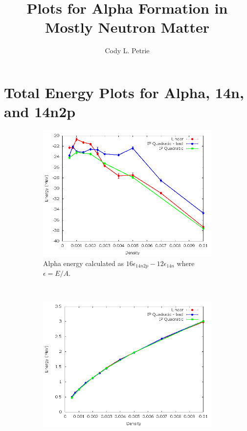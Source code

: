 \documentclass[12pt]{article}
\title{Plots for Alpha Formation in Mostly Neutron Matter}
\author{Cody L. Petrie}
\begin{document}
\maketitle
\tableofcontents
\newpage

\section{Total Energy Plots for Alpha, 14n, and 14n2p}
\begin{figure}[h!]
   \centering
   \begin{subfigure}{0.49\textwidth}
      \includegraphics[width=\textwidth]{../alpha.png}
      \caption{Alpha energy calculated as $16\epsilon_{14n2p}-12\epsilon_{14n}$ where $\epsilon=E/A$.}
   \end{subfigure}
   ~
   \begin{subfigure}{0.49\textwidth}
      \includegraphics[width=\textwidth]{../14n.png}

\end{subfigure}
\end{figure}
\end{document}

